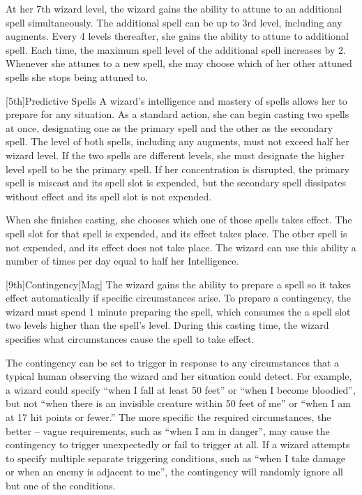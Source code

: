         At her 7th wizard level, the wizard gains the ability to attune to an additional spell simultaneously.
        The additional spell can be up to 3rd level, including any augments.
        Every 4 levels thereafter, she gains the ability to attune to additional spell.
        Each time, the maximum spell level of the additional spell increases by 2.
        Whenever she attunes to a new spell, she may choose which of her other attuned spells she stops being attuned to.

        [5th]{Predictive Spells}
        A wizard's intelligence and mastery of spells allows her to prepare for any situation.
        As a standard action, she can begin casting two spells at once, designating one as the primary spell and the other as the secondary spell.
        The level of both spells, including any augments, must not exceed half her wizard level.
        If the two spells are different levels, she must designate the higher level spell to be the primary spell.
        If her concentration is disrupted, the primary spell is miscast and its spell slot is expended, but the secondary spell dissipates without effect and its spell slot is not expended.

        When she finishes casting, she chooses which one of those spells takes effect.
        The spell slot for that spell is expended, and its effect takes place.
        The other spell is not expended, and its effect does not take place.
        The wizard can use this ability a number of times per day equal to half her Intelligence.

        [9th]{Contingency}[Mag]
        The wizard gains the ability to prepare a spell so it takes effect automatically if specific circumstances arise.
        To prepare a contingency, the wizard must spend 1 minute preparing the spell, which consumes the a spell slot two levels higher than the spell's level.
        During this casting time, the wizard specifies what circumstances cause the spell to take effect.

        The contingency can be set to trigger in response to any circumstances that a typical human observing the wizard and her situation could detect.
        For example, a wizard could specify ``when I fall at least 50 feet'' or ``when I become bloodied'', but not ``when there is an invisible creature within 50 feet of me'' or ``when I am at 17 hit points or fewer.'' The more specific the required circumstances, the better -- vague requirements, such as ``when I am in danger'', may cause the contingency to trigger unexpectedly or fail to trigger at all.
        If a wizard attempts to specify multiple separate triggering conditions, such as ``when I take damage or when an enemy is adjacent to me'', the contingency will randomly ignore all but one of the conditions.

